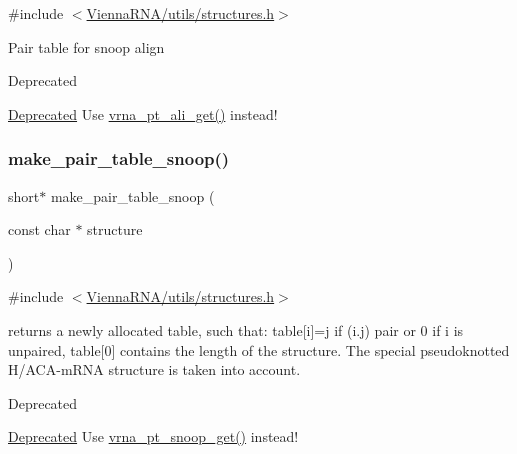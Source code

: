 {\ttfamily \#include $<$\mbox{\hyperlink{utils_2structures_8h}{Vienna\+R\+N\+A/utils/structures.\+h}}$>$}

Pair table for snoop align

\begin{DoxyRefDesc}{Deprecated}
\item[\mbox{\hyperlink{deprecated__deprecated000202}{Deprecated}}]Use \mbox{\hyperlink{group__struct__utils__pair__table_ga1ee4cdcda1f57d32dcb38032116d335d}{vrna\+\_\+pt\+\_\+ali\+\_\+get()}} instead!\end{DoxyRefDesc}
\mbox{\label{group__struct__utils__deprecated_ga9aa3bf3b4346bb7fb88efc154dd07a79}} 
\subsubsection{\texorpdfstring{make\_pair\_table\_snoop()}{make\_pair\_table\_snoop()}}
{\footnotesize\ttfamily short$\ast$ make\+\_\+pair\+\_\+table\+\_\+snoop (\begin{DoxyParamCaption}\item[{const char $\ast$}]{structure }\end{DoxyParamCaption})}



{\ttfamily \#include $<$\mbox{\hyperlink{utils_2structures_8h}{Vienna\+R\+N\+A/utils/structures.\+h}}$>$}

returns a newly allocated table, such that\+: table\mbox{[}i\mbox{]}=j if (i.\+j) pair or 0 if i is unpaired, table\mbox{[}0\mbox{]} contains the length of the structure. The special pseudoknotted H/\+A\+C\+A-\/m\+R\+NA structure is taken into account. \begin{DoxyRefDesc}{Deprecated}
\item[\mbox{\hyperlink{deprecated__deprecated000203}{Deprecated}}]Use \mbox{\hyperlink{group__struct__utils__pair__table_gaef0f7e1a6c00c81a349973de53039dda}{vrna\+\_\+pt\+\_\+snoop\+\_\+get()}} instead!\end{DoxyRefDesc}
\mbox{\label{group__struct__utils__deprecated_ga6ebbcd29a754f0e4f1a66d1fd84184db}} 

